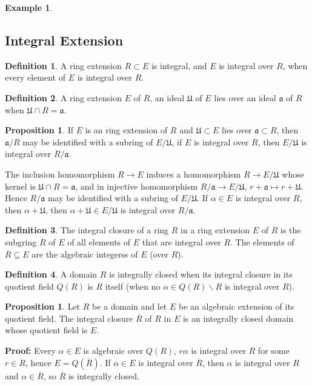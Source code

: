 \documentclass[11pt]{amsbook}%
\theoremstyle{plain}
\theoremstyle{definition}
\newtheorem{definition*}{Definition}
\newtheorem*{example*}{Example}
\newtheorem{proposition}[theorem]{Proposition}
\numberwithin{equation}{section}
\newcommand{\af}{\mathfrak a}
\newcommand{\UF}{\mathfrak U}
\renewcommand{\proof}{ \textbf{Proof: }}
\begin{document}
\begin{example*}
\subsection{Integral Extension}

\begin{definition*}
  A ring extension $R \subset E$ is integral, and $E$ is integral over $R$, when
  every element of $E$ is integral over $R$.
\end{definition*}

\begin{definition*}
  A ring extension $E$ of $R$, an ideal $\UF$ of $E$ lies over an ideal $\af$
  of $R$ when $\UF \cap R = \af$.
\end{definition*}

\begin{proposition}
  If $E$ is an ring extension of $R$ and $\UF \subset E$ lies over $\af \subset R$,
  then $\af/R$ may be identified with a subring of $E/\UF$, if $E$
  is integral over $R$, then $E/\UF$ is integral over $R/\af$.
\end{proposition}  \vspace{1.8em}
The inclusion homomorphism $R \longrightarrow E$ induces a homomorphism $R \longrightarrow E/\UF$
whose kernel is $\UF \cap R = \af$, and in injective homomorphism $R/\af \longrightarrow E/\UF$,
$r + \af \longmapsto r + \UF$. Hence $R/\af$ may be identified with a subring of $E/\UF$.
If $\alpha \in E$ is integral over $R$, then $\alpha + \UF$, then $\alpha + \UF \in E/\UF$ is integral
over $R/\af$. \qedsymbol

\begin{definition*}
  The integral closure of a ring $R$ in a ring extension $E$ of $R$ is the subgring $\overline{R}$
  of $E$ of all elements of $E$ that are integral over $R$. The elements of $\overline{R} \subseteq E$
  are the algebraic integerss of $E$ (over $R$).
\end{definition*}

\begin{definition*}
  A domain $R$ is integrally closed when its integral closure in its quotient field $Q(R)$ is
  $R$ itself (when no $\alpha \in Q(R)\backslash R$ is integral over $R$).
\end{definition*}

\begin{proposition}
  Let $R$ be a domain and let $E$ be an algebraic extension of its quotient field. The integral
  closure $\overline{R}$ of $R$ in $E$ is an integrally closed domain whose quotient field is $E$.
\end{proposition} \vspace{1.8em}
\proof Every $\alpha \in E$ is algebraic over $Q(R)$, $r\alpha$ is integral over $R$ for some $r \in R$,
hence $E = Q(\overline{R})$. If $\alpha \in E$ is integral over $\overline{R}$, then $\alpha$
is integral over $R$ and $\alpha \in \overline{R}$, so $\overline{R}$ is integrally closed. \qedsymbol


\end{example*}
\end{document}

